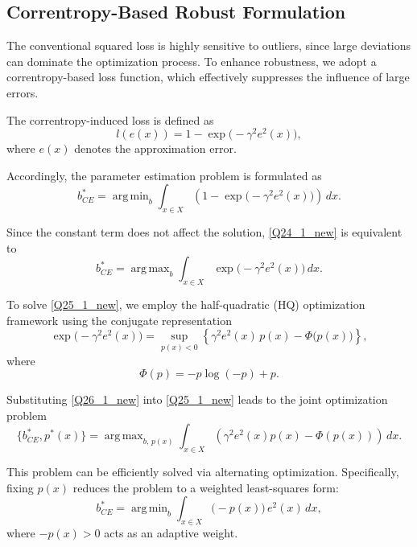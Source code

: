 \documentclass{elsarticle}
\DeclareMathOperator*{\argmax}{arg\,max}
\DeclareMathOperator*{\argmin}{arg\,min}
\begin{document}
\subsection{Correntropy-Based Robust Formulation}

The conventional squared loss is highly sensitive to outliers, since large deviations can dominate the optimization process. To enhance robustness, we adopt a correntropy-based loss function, which effectively suppresses the influence of large errors.

The correntropy-induced loss is defined as
\begin{equation}
	l(e(x)) = 1 - \exp\big(-\gamma^2 e^2(x)\big),
\end{equation}
where $e(x)$ denotes the approximation error.

Accordingly, the parameter estimation problem is formulated as
\begin{equation}\label{Q24_1_new}
	b^*_{CE} =
	\argmin_{b}
	\int_{x \in X}
	\left(1 - \exp\big(-\gamma^2 e^2(x)\big)\right)\, dx.
\end{equation}

Since the constant term does not affect the solution, \eqref{Q24_1_new} is equivalent to
\begin{equation}\label{Q25_1_new}
	b^*_{CE} =
	\argmax_{b}
	\int_{x \in X}
	\exp\big(-\gamma^2 e^2(x)\big)\, dx.
\end{equation}

To solve \eqref{Q25_1_new}, we employ the half-quadratic (HQ) optimization framework using the conjugate representation
\begin{equation}\label{Q26_1_new}
	\exp\big(-\gamma^2 e^2(x)\big) =
	\sup_{p(x) < 0}
	\left\{
	\gamma^2 e^2(x)\, p(x) - \Phi\big(p(x)\big)
	\right\},
\end{equation}
where
\begin{equation}
	\Phi(p) = -p \log(-p) + p.
\end{equation}

Substituting \eqref{Q26_1_new} into \eqref{Q25_1_new} leads to the joint optimization problem
\begin{equation}\label{Q28_1_new}
	\{b^*_{CE}, p^*(x)\} =
	\argmax_{b,\, p(x)}
	\int_{x \in X}
	\left(
	\gamma^2 e^2(x)p(x) - \Phi(p(x))
	\right)\, dx.
\end{equation}

This problem can be efficiently solved via alternating optimization. Specifically, fixing $p(x)$ reduces the problem to a weighted least-squares form:
\begin{equation}\label{Q29_1_new}
	b^*_{CE} =
	\argmin_{b}
	\int_{x \in X}
	\big(-p(x)\big)\, e^2(x) \, dx,
\end{equation}
where $-p(x) > 0$ acts as an adaptive weight.
\end{document}
